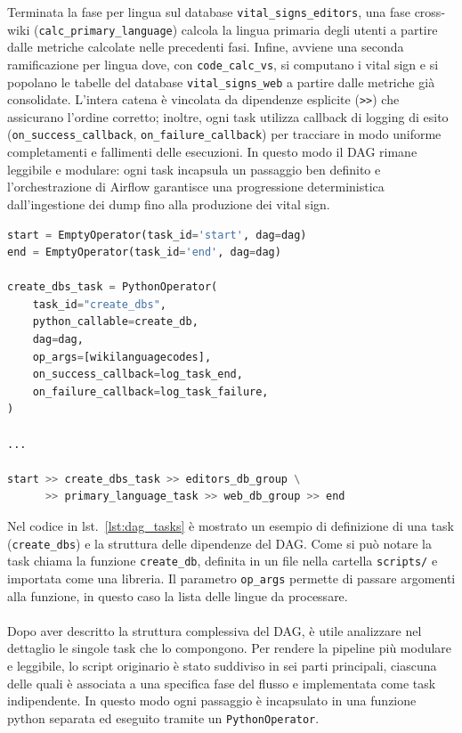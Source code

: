 Terminata la fase per lingua sul database \texttt{vital\_signs\_editors}, una fase cross-wiki (\texttt{calc\_primary\allowbreak\_language})
 calcola la lingua primaria degli utenti a partire dalle metriche calcolate nelle precedenti fasi.
Infine, avviene una seconda ramificazione per lingua dove, con \texttt{code\_calc\_vs}, si computano i vital sign e si popolano le tabelle del database \texttt{vital\_signs\_web} a partire dalle metriche già consolidate.
L’intera catena è vincolata da dipendenze esplicite (\texttt{>>}) che assicurano l’ordine corretto; inoltre, ogni task utilizza callback di logging di esito (\texttt{on\_success\_callback}, \texttt{on\_failure\_callback}) per tracciare in modo uniforme completamenti e fallimenti delle esecuzioni.
In questo modo il DAG rimane leggibile e modulare: ogni task incapsula un passaggio ben definito e l’orchestrazione di Airflow garantisce una progressione deterministica dall’ingestione dei dump fino alla produzione dei vital sign.


\begin{lstlisting}[language=Python, caption={Esempio di definizione di una task e dipendenze del DAG}, label=lst:dag_tasks, basicstyle=\scriptsize\ttfamily]
start = EmptyOperator(task_id='start', dag=dag)
end = EmptyOperator(task_id='end', dag=dag)

create_dbs_task = PythonOperator(
    task_id="create_dbs",
    python_callable=create_db,
    dag=dag,
    op_args=[wikilanguagecodes],
    on_success_callback=log_task_end,
    on_failure_callback=log_task_failure,
)

...

start >> create_dbs_task >> editors_db_group \
      >> primary_language_task >> web_db_group >> end
\end{lstlisting}

Nel codice in lst.~\ref{lst:dag_tasks} è mostrato un esempio di definizione di una task (\texttt{create\_dbs}) e la struttura delle dipendenze del DAG.
Come si può notare la task chiama la funzione \texttt{create\_db}, definita in un file nella cartella \texttt{scripts/} e importata come una libreria.
Il parametro \texttt{op\_args} permette di passare argomenti alla funzione, in questo caso la lista delle lingue da processare.
\paragraph{}
Dopo aver descritto la struttura complessiva del DAG, è utile analizzare nel dettaglio le singole task che lo compongono.
Per rendere la pipeline più modulare e leggibile, lo script originario è stato suddiviso in sei parti principali, ciascuna delle quali è associata a una specifica fase del flusso e implementata come task indipendente. In questo modo ogni passaggio è incapsulato in una funzione python separata ed eseguito tramite un \texttt{PythonOperator}.

